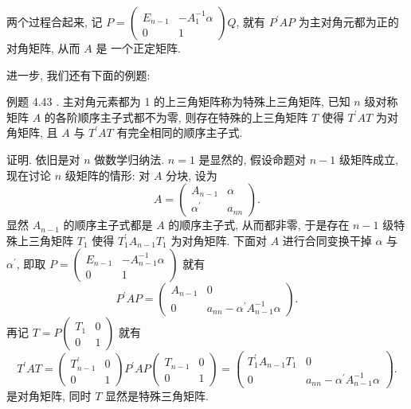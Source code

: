 \documentclass{article}
\begin{document}
两个过程合起来, 记 $P=\left(\begin{array}{cc}E_{n-1} & -A_{1}^{-1} \alpha \\ 0 & 1\end{array}\right) Q$, 就有 $P^{\prime} A P$ 为主对角元都为正的对角矩阵, 从而 $A$ 是
一个正定矩阵.

进一步, 我们还有下面的例题:

\vspace{1ex}
{\heiti 例题 4.43 .} {\kaishu 主对角元素都为 1 的上三角矩阵称为特殊上三角矩阵, 已知 $n$ 级对称矩阵 $A$ 的各阶顺序主子式都不为零, 则存在特殊的上三角矩阵 $T$ 使得 $T^{\prime} A T$ 为对角矩阵, 且 $A$ 与 $T^{\prime} A T$ 有完全相同的顺序主子式.}

\vspace{1ex}
证明. 依旧是对 $n$ 做数学归纳法. $n=1$ 是显然的, 假设命题对 $n-1$ 级矩阵成立, 现在讨论 $n$ 级矩阵的情形: 对 $A$ 分块, 设为
\begin{equation*}
    A=\left(\begin{array}{cc}
        A_{n-1}         & \alpha  \\
        \alpha^{\prime} & a_{n n}
    \end{array}\right).
\end{equation*}
显然 $A_{n-1}$ 的顺序主子式都是 $A$ 的顺序主子式, 从而都非零, 于是存在 $n-1$ 级特殊上三角矩阵 $T_{1}$ 使得 $T_{1}^{\prime} A_{n-1} T_{1}$ 为对角矩阵. 下面对 $A$ 进行合同变换干掉 $\alpha$ 与 $\alpha^{\prime}$, 即取 $P=\left(\begin{array}{cc}E_{n-1} & -A_{n-1}^{-1} \alpha \\ 0 & 1\end{array}\right)$ 就有
\begin{equation*}
    P^{\prime} A P=\left(\begin{array}{cc}
            A_{n-1} & 0                                           \\
            0       & a_{n n}-\alpha^{\prime} A_{n-1}^{-1} \alpha
        \end{array}\right).
\end{equation*}
再记 $T=P\left(\begin{array}{cc}T_{1} & 0 \\ 0 & 1\end{array}\right)$ 就有
\begin{equation*}
    T^{\prime} A T=\left(\begin{array}{cc}
            T_{n-1}^{\prime} & 0 \\
            0                & 1
        \end{array}\right) P^{\prime} A P\left(\begin{array}{cc}
            T_{n-1} & 0 \\
            0       & 1
        \end{array}\right)=\left(\begin{array}{cc}
            T_{1}^{\prime} A_{n-1} T_{1} & 0                                           \\
            0                            & a_{n n}-\alpha^{\prime} A_{n-1}^{-1} \alpha
        \end{array}\right).
\end{equation*}
是对角矩阵, 同时 $T$ 显然是特殊三角矩阵.
\end{document}
